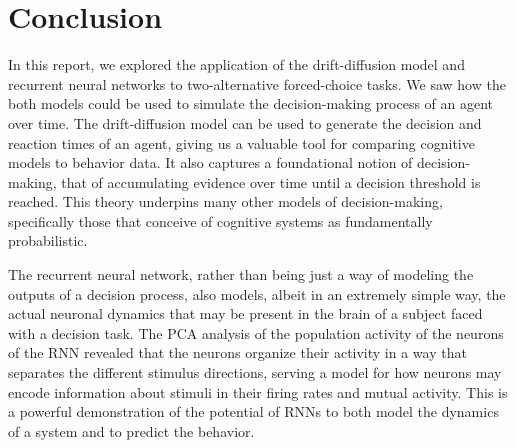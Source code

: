 \documentclass{article}
\begin{document}
\section*{Conclusion}

In this report, we explored the application of the drift-diffusion model and recurrent neural networks to two-alternative forced-choice tasks. We saw how the both models could be used to simulate the decision-making process of an agent over time. The drift-diffusion model can be used to generate the decision and reaction times of an agent, giving us a valuable tool for comparing cognitive models to behavior data. It also captures a foundational notion of decision-making, that of accumulating evidence over time until a decision threshold is reached. This theory underpins many other models of decision-making, specifically those that conceive of cognitive systems as fundamentally probabilistic.
\vspace{1em}


The recurrent neural network, rather than being just a way of modeling the outputs of a decision process, also models, albeit in an extremely simple way, the actual neuronal dynamics that may be present in the brain of a subject faced with a decision task. The PCA analysis of the population activity of the neurons of the RNN revealed that the neurons organize their activity in a way that separates the different stimulus directions, serving a model for how neurons may encode information about stimuli in their firing rates and mutual activity. This is a powerful demonstration of the potential of RNNs to both model the dynamics of a system and to predict the behavior.
\end{document}
